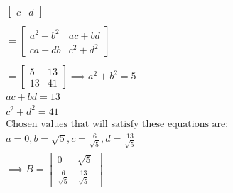 \documentclass[oneside, a4paper]{article}
\begin{document}
\begin{equation}
\begin{split}
\begin{bmatrix}
                c & d 
            \end{bmatrix} \\ \\
        = 
            \begin{bmatrix}
                a^2 + b^2 & ac + bd \\
                ca + db & c^2 + d^2 
            \end{bmatrix} \\ \\
        = 
            \begin{bmatrix}
                5 & 13 \\
                13 & 41 
            \end{bmatrix} 
        \implies a^2 + b^2 = 5\\
        ac + bd = 13 \\
        c^2 + d^2 = 41 \\
        \text{Chosen values that will satisfy these equations are: } \\
        a = 0, b = \sqrt{5}, c = \frac{6}{\sqrt{5}}, d = \frac{13}{\sqrt{5}} \\
        \implies B = 
            \begin{bmatrix}
                0 & \sqrt{5} \\
                \frac{6}{\sqrt{5}} & \frac{13}{\sqrt{5}}
            \end{bmatrix} 
    \end{split}
\end{equation}
\end{document}
